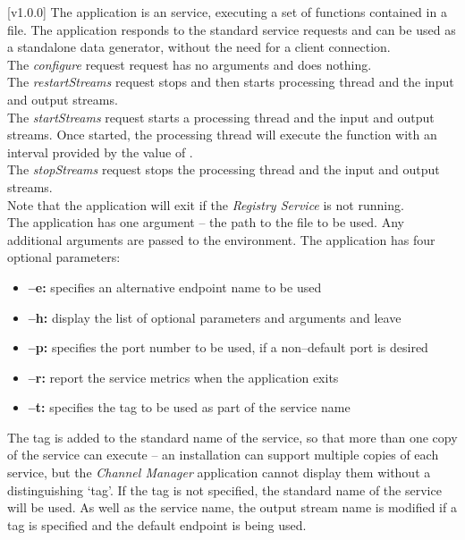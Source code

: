 [v1.0.0]
The  application is an  service,
executing a set of \JS{} functions contained in a file.
The application responds to the standard  service requests and can be used
as a standalone data generator, without the need for a client connection.\\

The \emph{configure} request request has no arguments and does nothing.\\

The \emph{restartStreams} request stops and then starts processing thread and the input
and output streams.\\

The \emph{startStreams} request starts a processing thread and the input and output
streams.
Once started, the processing thread will execute the  function with
an interval provided by the value of .\\

The \emph{stopStreams} request stops the processing thread and the input and output
streams.\\ 

Note that the application will exit if the \emph{Registry Service} is not running.\\

The application has one argument -- the path to the \JS{} file to be used.
Any additional arguments are passed to the \JS{} environment.
The application has four optional parameters:
\begin{itemize}
\item \textbf{--e:} specifies an alternative endpoint name to be used
\item \textbf{--h:} display the list of optional parameters and arguments and leave
\item \textbf{--p:} specifies the port number to be used, if a non--default port is desired
\item \textbf{--r:} report the service metrics when the application exits
\item \textbf{--t:} specifies the tag to be used as part of the service name
\end{itemize}
The tag is added to the standard name of the service, so that more than one copy of the
service can execute -- an \mplusm{} installation can support multiple copies of each
 service, but the \emph{Channel Manager} application cannot display them
without a distinguishing `tag'.
If the tag is not specified, the standard name of the service will be used.
As well as the service name, the output stream name is modified if a tag is specified and
the default endpoint is being used.\\


